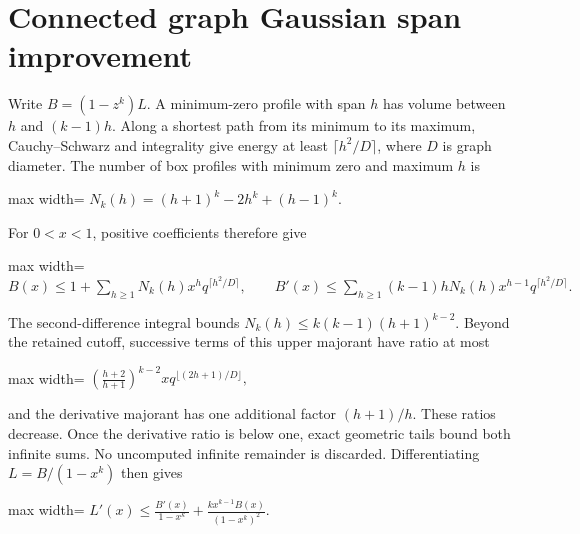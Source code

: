 \documentclass[
  11pt,
  a4paper,
]{report}
\begin{document}
\hypertarget{connected-graph-gaussian-span-improvement}{%
\section{Connected graph Gaussian span
improvement}\label{connected-graph-gaussian-span-improvement}}

Write \(B=(1-z^k)L\). A minimum-zero profile with span \(h\) has volume
between \(h\) and \((k-1)h\). Along a shortest path from its minimum to
its maximum, Cauchy--Schwarz and integrality give energy at least
\(\lceil h^2/D\rceil\), where \(D\) is graph diameter. The number of box
profiles with minimum zero and maximum \(h\) is

\begin{center}
\begin{adjustbox}{max width=\linewidth}
$\displaystyle
N_k(h)=(h+1)^k-2h^k+(h-1)^k.
$
\end{adjustbox}
\end{center}

For \(0<x<1\), positive coefficients therefore give

\begin{center}
\begin{adjustbox}{max width=\linewidth}
$\displaystyle
B(x)\le1+\sum_{h\ge1}N_k(h)x^h q^{\lceil h^2/D\rceil},\qquad
B'(x)\le\sum_{h\ge1}(k-1)hN_k(h)x^{h-1}q^{\lceil h^2/D\rceil}.
$
\end{adjustbox}
\end{center}

The second-difference integral bounds \(N_k(h)\le k(k-1)(h+1)^{k-2}\).
Beyond the retained cutoff, successive terms of this upper majorant have
ratio at most

\begin{center}
\begin{adjustbox}{max width=\linewidth}
$\displaystyle
\left(\frac{h+2}{h+1}\right)^{k-2}
xq^{\lfloor(2h+1)/D\rfloor},
$
\end{adjustbox}
\end{center}

and the derivative majorant has one additional factor \((h+1)/h\). These
ratios decrease. Once the derivative ratio is below one, exact geometric
tails bound both infinite sums. No uncomputed infinite remainder is
discarded. Differentiating \(L=B/(1-x^k)\) then gives

\begin{center}
\begin{adjustbox}{max width=\linewidth}
$\displaystyle
L'(x)\le\frac{B'(x)}{1-x^k}
+\frac{kx^{k-1}B(x)}{(1-x^k)^2}.
$
\end{adjustbox}
\end{center}
\end{document}
